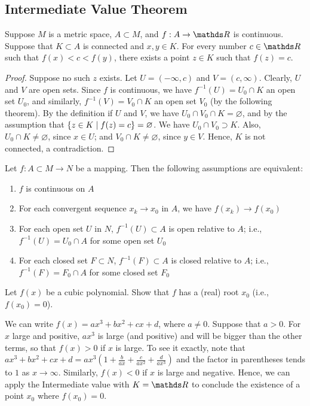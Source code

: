 \documentclass[../main-sheet.tex]{subfiles}
\begin{document}
\subsection{Intermediate Value Theorem} Suppose $ M $ is a metric space, $ A\subset M $, and $ f:A\to\R  $ is continuous. Suppose that $ K\subset A $ is connected and $ x,y\in K $. For every number $ c\in\R $ such that $ f(x)<c<f(y) $, there exists a point $ z\in K $ such that $ f(z)=c $.
\begin{proof}
    Suppose no such $ z $ exists. Let $ U=(-\infty,c) $ and $ V=(c,\infty) $. Clearly, $ U $ and $ V $ are open sets. Since $ f $ is continuous, we have $ f^{-1}(U)=U_0\cap K $ an open set $ U_0 $, and similarly, $ f^{-1}(V)=V_0\cap K $ an open set $ V_0 $ (by the following theorem). By the definition if $ U $ and $ V $, we have $ U_0\cap V_0\cap K=\varnothing $, and by the assumption  that $ \left\{z\in K\mid f(z)=c\right\}=\varnothing $. We have $ U_0\cap V_0 \supset K$. Also, $ U_0 \cap K\neq \varnothing $, since $ x\in U $; and $ V_0\cap K\neq \varnothing $, since $ y\in V $. Hence, $ K $ is not connected, a contradiction.
\end{proof}
\begin{thm}
    Let $ f:A\subset M \to N $ be a mapping. Then the following assumptions are equivalent:
    \begin{enumerate}[label=(\roman*)]
        \item $ f $ is continuous on $ A $
        \item For each convergent sequence $ x_k \to x_0 $ in $ A $, we have $ f(x_k)\to f(x_0) $
        \item For each open set $ U  $ in $ N $, $ f^{-1}(U)\subset A $ is open relative to $ A $; i.e., $ f^{-1}(U) =U_0 \cap A $ for some open set $ U_0 $
        \item For each closed set $ F\subset N  $, $ f^{-1}(F)\subset A $ is closed relative to $ A $; i.e., $ f^{-1}(F) =F_0 \cap A $ for some closed set $ F_0 $
    \end{enumerate}
\end{thm}
\begin{prob}
    Let $ f(x) $ be a cubic polynomial. Show that $ f $ has a (real) root $ x_0 $ (i.e., $ f(x_0)=0 $).
\end{prob}
\begin{soln}
    We can write $ f(x)=ax^3+bx^2+cx+d $, where $ a\neq 0 $. Suppose that $ a>0 $. For $ x $ large and positive, $ ax^3 $ is large (and positive) and will be bigger than the other terms, so that $ f(x)> 0$ if $ x $ is large. To see it exactly, note that $ ax^3+bx^2+cx+d=ax^3\left( 1+\frac{b}{ax}+\frac{c}{ax^2}+\frac{d}{ax^3} \right)  $ and the factor in parentheses tends to $ 1 $ as $ x\to \infty $. Similarly, $ f(x)<0 $ if $ x $ is large and negative. Hence, we can apply the Intermediate value with $ K=\R $ to conclude the existence of a point $ x_0 $ where $ f(x_0)=0 $.
\end{soln}
\end{document}
